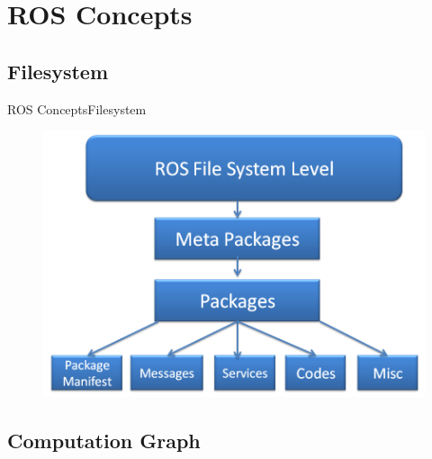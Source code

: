 \documentclass{beamer}
\begin{document}
\section{ROS Concepts}

\subsection{Filesystem}

\begin{frame}{ROS Concepts}{Filesystem}
\begin{figure}
\centering
\includegraphics[scale=0.4]{figs/img/filesystem}
\end{figure}
  
\end{frame}


\subsection{Computation Graph}
\end{document}
